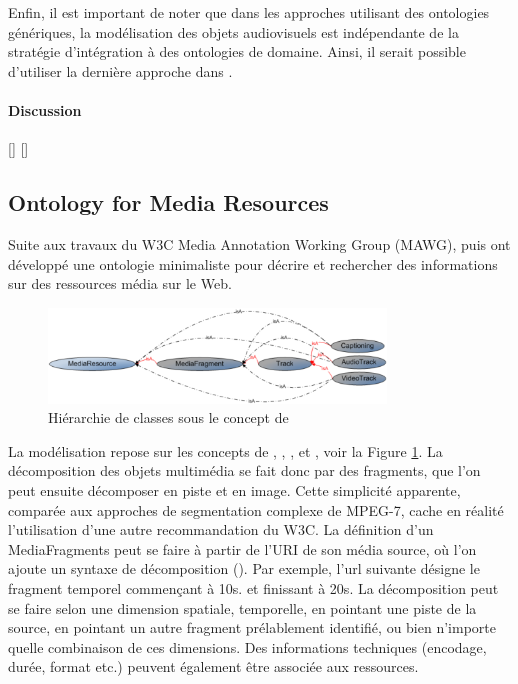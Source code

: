 Enfin, il est important de noter que dans les approches utilisant des ontologies génériques, la modélisation des objets audiovisuels est indépendante de la stratégie d'intégration à des ontologies de domaine. 
Ainsi, il serait possible d'utiliser la dernière approche dans .

\paragraph{Discussion}
[]
[]



\subsection{Ontology for Media Resources}
Suite aux travaux du W3C Media Annotation Working Group (MAWG), \cite{Burger2011} puis \cite{Lee2012} ont développé une ontologie minimaliste pour décrire et rechercher des informations sur des ressources média sur le Web.

\begin{figure}[ht!]
\centering
\includegraphics[width=0.8\textwidth]{images/MA-model.png}
\caption{Hiérarchie de classes sous le concept de }
\label{img:ma-model}
\end{figure}

La modélisation repose sur les concepts de , , ,  et , voir la Figure \ref{img:ma-model}.
La décomposition des objets multimédia se fait donc par des fragments, que l'on peut ensuite décomposer en piste et en image.
Cette simplicité apparente, comparée aux approches de segmentation complexe de MPEG-7, cache en réalité l'utilisation d'une autre recommandation du W3C.
La définition d'un MediaFragments peut se faire à partir de l'URI de son média source, où l'on ajoute un syntaxe de décomposition (\cite{Hausenblas2011}).
Par exemple, l'url suivante  désigne le fragment temporel commençant à 10s. et finissant à 20s.
La décomposition peut se faire selon une dimension spatiale, temporelle, en pointant une piste de la source, en pointant un autre fragment prélablement identifié, ou bien n'importe quelle combinaison de ces dimensions.
Des informations techniques (encodage, durée, format etc.) peuvent également être associée aux ressources.

